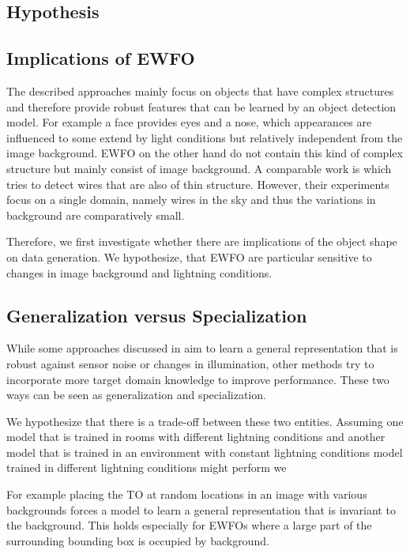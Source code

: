 \subsection{Hypothesis}
\label{sec:training:hypothesis}

\subsection{Implications of \ac{EWFO}}

The described approaches mainly focus on objects that have complex structures and therefore provide robust features that can be learned by an object detection model. For example a face provides eyes and a nose, which appearances are influenced to some extend by light conditions but relatively independent from the image background. \ac{EWFO} on the other hand do not contain this kind of complex structure but mainly consist of image background. A comparable work is \cite{Madaan2017} which tries to detect wires that are also of thin structure. However, their experiments focus on a single domain, namely wires in the sky and thus the variations in background are comparatively small.

Therefore, we first investigate whether there are implications of the object shape on data generation. We hypothesize, that \ac{EWFO} are particular sensitive to changes in image background and lightning conditions. 

\subsection{Generalization versus Specialization}
\label{sec:training:genvsspc}

While some approaches discussed in  aim to learn a general representation that is robust against sensor noise or changes in illumination, other methods try to incorporate more target domain knowledge to improve performance. These two ways can be seen as generalization and specialization.

We hypothesize that there is a trade-off between these two entities. Assuming one model that is trained in rooms with different lightning conditions and another model that is trained in an environment with constant lightning conditions model trained in different lightning conditions might perform we

For example placing the \ac{TO} at random locations in an image with various backgrounds forces a model to learn a general representation that is invariant to the background. This holds especially for \acp{EWFO} where a large part of the surrounding bounding box is occupied by background.

